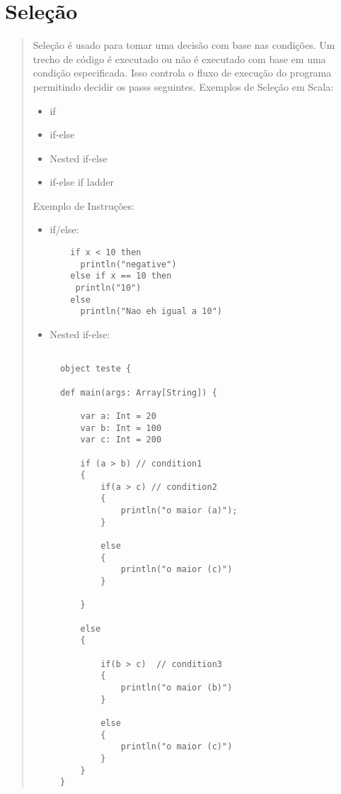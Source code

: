 \section{Sele\c{c}\~{a}o}
\begin{quote}
  Seleção é usado para tomar uma decisão com base nas condições. Um trecho de código é executado ou não é executado com base em uma condição especificada. Isso controla o fluxo de execução do programa permitindo decidir os passs seguintes.
  \cite{Wampler2021}
  \hspace{2.5mm} Exemplos de Seleção em Scala:

  \begin{itemize}
    \item if
    \item if-else
    \item Nested if-else
    \item if-else if ladder
  \end{itemize}

  \hspace{2.5mm}Exemplo de Instruções:

  \begin{itemize}

    \item if/else:

          \begin{lstlisting}
    if x < 10 then
      println("negative")
    else if x == 10 then
     println("10")
    else
      println("Nao eh igual a 10")
  \end{lstlisting}

    \item Nested if-else:

          \begin{lstlisting}

  object teste {

  def main(args: Array[String]) {

      var a: Int = 20
      var b: Int = 100
      var c: Int = 200

      if (a > b) // condition1
      {
          if(a > c) // condition2
          {
              println("o maior (a)");
          }

          else
          {
              println("o maior (c)")
          }

      }

      else
      {

          if(b > c)  // condition3
          {
              println("o maior (b)")
          }

          else
          {
              println("o maior (c)")
          }
      }
  }
  \end{lstlisting}
  \end{itemize}
\end{quote}





